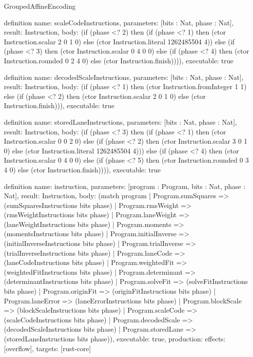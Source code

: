 \begin{lexlean}{GroupedAffineEncoding}
\begin{semanticmodule}
definition{
  name: scaleCodeInstructions,
  parameters: [bits : Nat, phase : Nat],
  result: Instruction,
  body: (if (phase <? 2) then (if (phase <? 1) then (ctor Instruction.scalar 2 0 1 0) else (ctor Instruction.literal 1262485504 4)) else (if (phase <? 3) then (ctor Instruction.scalar 0 4 0 0) else (if (phase <? 4) then (ctor Instruction.rounded 0 2 4 0) else (ctor Instruction.finish)))),
  executable: true
}

definition{
  name: decodedScaleInstructions,
  parameters: [bits : Nat, phase : Nat],
  result: Instruction,
  body: (if (phase <? 1) then (ctor Instruction.fromInteger 1 1) else (if (phase <? 2) then (ctor Instruction.scalar 2 0 1 0) else (ctor Instruction.finish))),
  executable: true
}

definition{
  name: storedLaneInstructions,
  parameters: [bits : Nat, phase : Nat],
  result: Instruction,
  body: (if (phase <? 3) then (if (phase <? 1) then (ctor Instruction.scalar 0 0 2 0) else (if (phase <? 2) then (ctor Instruction.scalar 3 0 1 0) else (ctor Instruction.literal 1262485504 4))) else (if (phase <? 4) then (ctor Instruction.scalar 0 4 0 0) else (if (phase <? 5) then (ctor Instruction.rounded 0 3 4 0) else (ctor Instruction.finish)))),
  executable: true
}

definition{
  name: instruction,
  parameters: [program : Program, bits : Nat, phase : Nat],
  result: Instruction,
  body: (match program
    | Program.sumSquares => (sumSquaresInstructions bits phase)
    | Program.rmsWeight => (rmsWeightInstructions bits phase)
    | Program.laneWeight => (laneWeightInstructions bits phase)
    | Program.moments => (momentsInstructions bits phase)
    | Program.initialInverse => (initialInverseInstructions bits phase)
    | Program.trialInverse => (trialInverseInstructions bits phase)
    | Program.laneCode => (laneCodeInstructions bits phase)
    | Program.weightedFit => (weightedFitInstructions bits phase)
    | Program.determinant => (determinantInstructions bits phase)
    | Program.solveFit => (solveFitInstructions bits phase)
    | Program.originFit => (originFitInstructions bits phase)
    | Program.laneError => (laneErrorInstructions bits phase)
    | Program.blockScale => (blockScaleInstructions bits phase)
    | Program.scaleCode => (scaleCodeInstructions bits phase)
    | Program.decodedScale => (decodedScaleInstructions bits phase)
    | Program.storedLane => (storedLaneInstructions bits phase)),
  executable: true,
  production: {effects: [overflow], targets: [rust-core]}
}


\end{semanticmodule}
\end{lexlean}
